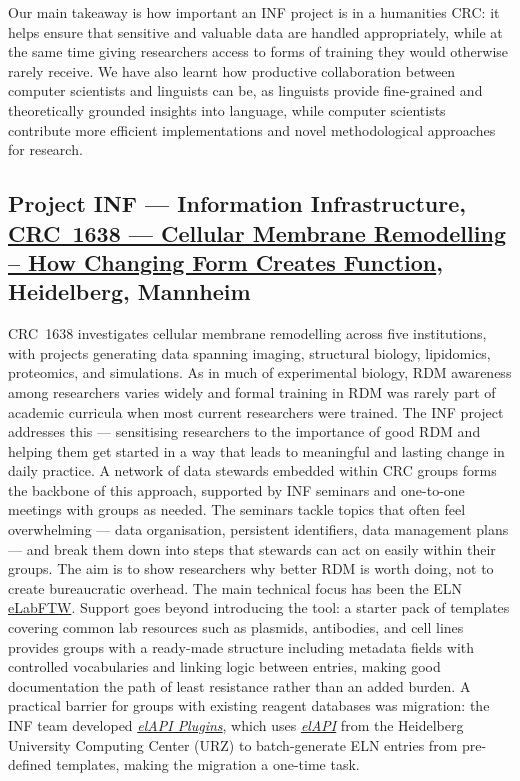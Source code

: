 \documentclass{eceasst}
\newcommand{\elabftw}{\href{https://www.elabftw.net/}{eLabFTW}}
\begin{document}
Our main takeaway is how important an INF project is in a humanities CRC: it helps ensure that sensitive and valuable data are handled appropriately, while at the same time giving researchers access to forms of training they would otherwise rarely receive.
We have also learnt how productive collaboration between computer scientists and linguists can be, as linguists provide fine-grained and theoretically grounded insights into language, while computer scientists contribute more efficient implementations and novel methodological approaches for research.

\subsection{Project INF --- Information Infrastructure, \href{https://www.sfb1638.de/}{CRC~1638 --- Cellular Membrane Remodelling -- How Changing Form Creates Function}, Heidelberg, Mannheim}
CRC~1638 investigates cellular membrane remodelling across five institutions, with projects generating data spanning imaging, structural biology, lipidomics, proteomics, and simulations.
As in much of experimental biology, RDM awareness among researchers varies widely and formal training in RDM was rarely part of academic curricula when most current researchers were trained.
The INF project addresses this --- sensitising researchers to the importance of good RDM and helping them get started in a way that leads to meaningful and lasting change in daily practice.
A network of data stewards embedded within CRC groups forms the backbone of this approach, supported by INF seminars and one-to-one meetings with groups as needed.
The seminars tackle topics that often feel overwhelming --- data organisation, persistent identifiers, data management plans --- and break them down into steps that stewards can act on easily within their groups.
The aim is to show researchers why better RDM is worth doing, not to create bureaucratic overhead.
The main technical focus has been the ELN \elabftw.
Support goes beyond introducing the tool: a starter pack of templates covering common lab resources such as plasmids, antibodies, and cell lines provides groups with a ready-made structure including metadata fields with controlled vocabularies and linking logic between entries, making good documentation the path of least resistance rather than an added burden.
A practical barrier for groups with existing reagent databases was migration: the INF team developed \href{https://github.com/sfb1638/elAPI\_Plugins}{\textit{elAPI Plugins}}, which uses \href{https://github.com/uhd-urz/elAPI}{\textit{elAPI}} from the Heidelberg University Computing Center (URZ) to batch-generate ELN entries from pre-defined templates, making the migration a one-time task.
\end{document}
